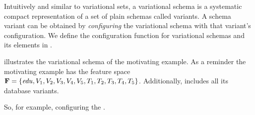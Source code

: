 Intuitively and similar to variational sets, a variational schema is a systematic  
compact representation of a set of plain schemas called variants.
A schema variant can be obtained 
by \emph{configuring} the variational schema with that variant's configuration.
We define the configuration function for variational schemas and its elements in .

\begin{example}
\label{eg:vsch-mot}
 illustrates the variational schema of the motivating example. 
As a reminder the motivating example has the feature space $\fSet = \setDef {\edu,
\vOne, \vTwo, \vThree, \vFour, \vFive, \tOne, \tTwo, \tThree, \tFour, \tFive}$. Additionally,
 includes all its database variants. 

So, for example, configuring the .
\end{example}

